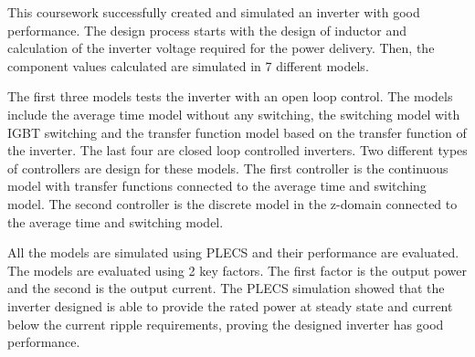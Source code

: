 \documentclass[12pt]{article}
\begin{document}
This coursework successfully created and simulated an inverter with good performance.
The design process starts with the design of inductor and calculation of the inverter voltage required for the power delivery.
Then, the component values calculated are simulated in 7 different models.

The first three models tests the inverter with an open loop control.
The models include the average time model without any switching, the switching model with IGBT switching and the transfer function model based on the transfer function of the inverter.
The last four are closed loop controlled inverters.
Two different types of controllers are design for these models.
The first controller is the continuous model with transfer functions connected to the average time and switching model.
The second controller is the discrete model in the z-domain connected to the average time and switching model.

All the models are simulated using PLECS and their performance are evaluated.
The models are evaluated using 2 key factors.
The first factor is the output power and the second is the output current.
The PLECS simulation showed that the inverter designed is able to provide the rated power at steady state and current below the current ripple requirements, proving the designed inverter has good performance.
\end{document}
